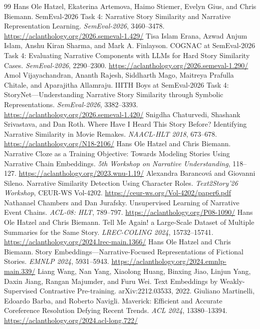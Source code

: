 \documentclass[11pt,letterpaper]{article}
\begin{document}
\newpage
\begin{thebibliography}{99}
\footnotesize\setlength{\itemsep}{0pt}
 Hans Ole Hatzel, Ekaterina Artemova, Haimo Stiemer, Evelyn Gius, and Chris Biemann. SemEval-2026 Task 4: Narrative Story Similarity and Narrative Representation Learning. \emph{SemEval-2026}, 3460--3478. \url{https://aclanthology.org/2026.semeval-1.429/}
 Tisa Islam Erana, Azwad Anjum Islam, Anshu Kiran Sharma, and Mark A. Finlayson. COGNAC at SemEval-2026 Task 4: Evaluating Narrative Components with LLMs for Hard Story Similarity Cases. \emph{SemEval-2026}, 2290--2300. \url{https://aclanthology.org/2026.semeval-1.290/}
 Amol Vijayachandran, Ananth Rajesh, Siddharth Mago, Maitreya Prafulla Chitale, and Aparajitha Allamraju. IIITH Boys at SemEval-2026 Task 4: StoryNet---Understanding Narrative Story Similarity through Symbolic Representations. \emph{SemEval-2026}, 3382--3393. \url{https://aclanthology.org/2026.semeval-1.420/}
 Snigdha Chaturvedi, Shashank Srivastava, and Dan Roth. Where Have I Heard This Story Before? Identifying Narrative Similarity in Movie Remakes. \emph{NAACL-HLT 2018}, 673--678. \url{https://aclanthology.org/N18-2106/}
 Hans Ole Hatzel and Chris Biemann. Narrative Cloze as a Training Objective: Towards Modeling Stories Using Narrative Chain Embeddings. \emph{5th Workshop on Narrative Understanding}, 118--127. \url{https://aclanthology.org/2023.wnu-1.19/}
 Alexandra Barancov\'a and Giovanni Sileno. Narrative Similarity Detection Using Character Roles. \emph{Text2Story'26 Workshop}, CEUR-WS Vol-4202. \url{https://ceur-ws.org/Vol-4202/paper6.pdf}
 Nathanael Chambers and Dan Jurafsky. Unsupervised Learning of Narrative Event Chains. \emph{ACL-08: HLT}, 789--797. \url{https://aclanthology.org/P08-1090/}
 Hans Ole Hatzel and Chris Biemann. Tell Me Again! a Large-Scale Dataset of Multiple Summaries for the Same Story. \emph{LREC-COLING 2024}, 15732--15741. \url{https://aclanthology.org/2024.lrec-main.1366/}
 Hans Ole Hatzel and Chris Biemann. Story Embeddings---Narrative-Focused Representations of Fictional Stories. \emph{EMNLP 2024}, 5931--5943. \url{https://aclanthology.org/2024.emnlp-main.339/}
 Liang Wang, Nan Yang, Xiaolong Huang, Binxing Jiao, Linjun Yang, Daxin Jiang, Rangan Majumder, and Furu Wei. Text Embeddings by Weakly-Supervised Contrastive Pre-training. arXiv:2212.03533, 2022.
 Giuliano Martinelli, Edoardo Barba, and Roberto Navigli. Maverick: Efficient and Accurate Coreference Resolution Defying Recent Trends. \emph{ACL 2024}, 13380--13394. \url{https://aclanthology.org/2024.acl-long.722/}

\end{thebibliography}
\end{document}
